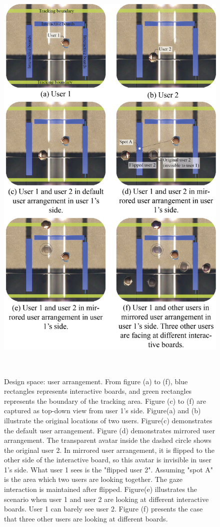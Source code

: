 \documentclass{sigchi}
\begin{document}
\begin{figure}[t!]
 \centering
 \includegraphics[width=0.95\columnwidth]{Figure3.png}
 \caption{Design space: user arrangement. From figure (a) to (f), blue rectangles represents interactive boards, and green rectangles represents the boundary of the tracking area. Figure (c) to (f) are captured as top-down view from user 1's side. Figure(a) and (b) illustrate the original locations of two users. Figure(c) demonstrates the default user arrangement. Figure (d) demonstrates mirrored user arrangement. The transparent avatar inside the dashed circle shows the original user 2. In mirrored user arrangement, it is flipped to the other side of the interactive board, so this avatar is invisible in user 1's side. What user 1 sees is the "flipped user 2". Assuming "spot A" is the area which two users are looking together. The gaze interaction is maintained after flipped. Figure(e) illustrates the scenario when user 1 and user 2 are looking at different interactive boards. User 1 can barely see user 2. Figure (f) presents the case that three other users are looking at different boards.
 }~\label{fig:userarrangement}
\end{figure}
\end{document}

